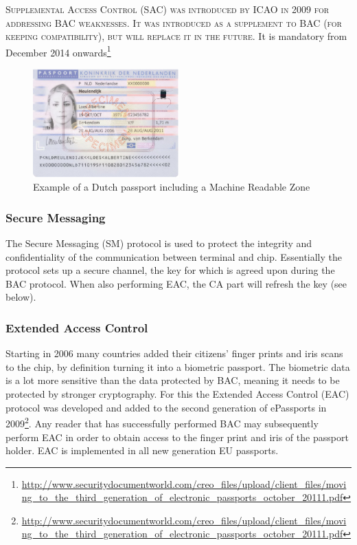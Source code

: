 \textsc{Supplemental Access Control (SAC) was introduced by ICAO in 2009 for addressing BAC weaknesses. It was introduced as a supplement to BAC (for keeping compatibility), but will replace it in the future.} It is mandatory from December 2014 onwards\footnote{\url{http://www.securitydocumentworld.com/creo_files/upload/client_files/moving_to_the_third_generation_of_electronic_passports_october_20111.pdf}}

\begin{figure}[htb]
	\centering
		\includegraphics[width=0.50\textwidth]{images/dutchpassport.png}
	\caption{Example of a Dutch passport including a Machine Readable Zone}
	\label{fig:dutchpassport}
\end{figure}

\subsubsection{Secure Messaging}
The Secure Messaging (SM) protocol is used to protect the integrity and confidentiality of the communication between terminal and chip. Essentially the protocol sets up a secure channel, the key for which is agreed upon during the BAC protocol. When also performing EAC, the CA part will refresh the key (see below).

\subsubsection{Extended Access Control}
Starting in 2006 many countries added their citizens' finger prints and iris scans to the chip, by definition turning it into a biometric passport. The biometric data is a lot more sensitive than the data protected by BAC, meaning it needs to be protected by stronger cryptography. For this the Extended Access Control (EAC) protocol was developed and added to the second generation of ePassports in 2009\footnote{\url{http://www.securitydocumentworld.com/creo_files/upload/client_files/moving_to_the_third_generation_of_electronic_passports_october_20111.pdf}}. Any reader that has successfully performed BAC may subsequently perform EAC in order to obtain access to the finger print and iris of the passport holder. EAC is implemented in all new generation EU passports.

